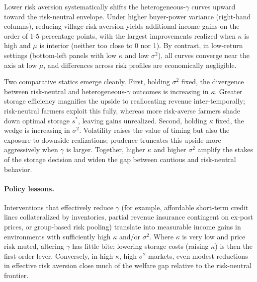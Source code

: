 Lower risk aversion systematically shifts the heterogeneous-$\gamma$ curves upward toward the risk-neutral envelope. Under higher buyer-power variance (right-hand columns), reducing village risk aversion yields additional income gains on the order of 1-5 percentage points, with the largest improvements realized when $\kappa$ is high and $\mu$ is interior (neither too close to 0 nor 1). By contrast, in low-return settings (bottom-left panels with low $\kappa$ and low $\sigma^2$), all curves converge near the axis at low $\mu$, and differences across risk profiles are economically negligible.

Two comparative statics emerge cleanly. First, holding $\sigma^2$ fixed, the divergence between risk-neutral and heterogeneous-$\gamma$ outcomes is increasing in $\kappa$. Greater storage efficiency magnifies the upside to reallocating revenue inter-temporally; risk-neutral farmers exploit this fully, whereas more risk-averse farmers shade down optimal storage $s^*$, leaving gains unrealized. Second, holding $\kappa$ fixed, the wedge is increasing in $\sigma^2$. Volatility raises the value of timing but also the exposure to downside realizations; prudence truncates this upside more aggressively when $\gamma$ is larger. Together, higher $\kappa$ and higher $\sigma^2$ amplify the stakes of the storage decision and widen the gap between cautious and risk-neutral behavior.


\paragraph{Policy lessons.} 
Interventions that effectively reduce $\gamma$ (for example, affordable short-term credit lines collateralized by inventories, partial revenue insurance contingent on ex-post prices, or group-based risk pooling) translate into measurable income gains in environments with sufficiently high $\kappa$ and/or $\sigma^2$. Where $\kappa$ is very low and price risk muted, altering $\gamma$ has little bite; lowering storage costs (raising $\kappa$) is then the first-order lever. Conversely, in high-$\kappa$, high-$\sigma^2$ markets, even modest reductions in effective risk aversion close much of the welfare gap relative to the risk-neutral frontier.






